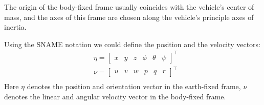     The origin of the body-fixed frame usually coincides with the vehicle's center of mass,
     and the axes of this frame are chosen along the vehicle's principle axes of inertia.

    Using the SNAME notation we could define the position and the velocity vectors:    
    $$
    \begin{aligned}
    & \eta=\left[\begin{array}{llllll}
        x & y & z & \phi & \theta & \psi
        \end{array}\right]^{\top} \\
    & \nu=\left[\begin{array}{llllll}
    u & v & w & p & q & r
    \end{array}\right]^{\top} \\
    \end{aligned}
    $$
    Here $\eta$ denotes the position and orientation vector in the earth-fixed frame, 
    $\nu$ denotes the linear and angular velocity vector in the body-fixed frame.


